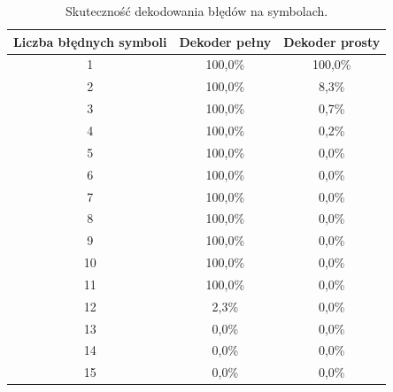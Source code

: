 \begin{table}[h]
\centering
\begin{tabular}{ccc}
\toprule
Liczba błędnych symboli & Dekoder pełny & Dekoder prosty \\
\midrule
1 & 100,0\% & 100,0\% \\
2 & 100,0\% & 8,3\% \\
3 & 100,0\% & 0,7\% \\
4 & 100,0\% & 0,2\% \\
5 & 100,0\% & 0,0\% \\
6 & 100,0\% & 0,0\% \\
7 & 100,0\% & 0,0\% \\
8 & 100,0\% & 0,0\% \\
9 & 100,0\% & 0,0\% \\
10 & 100,0\% & 0,0\% \\
11 & 100,0\% & 0,0\% \\
12 & 2,3\% & 0,0\% \\
13 & 0,0\% & 0,0\% \\
14 & 0,0\% & 0,0\% \\
15 & 0,0\% & 0,0\% \\
\bottomrule
\end{tabular}
\caption{Skuteczność dekodowania błędów na symbolach.}
\label{tab:symbol_results}
\end{table}
